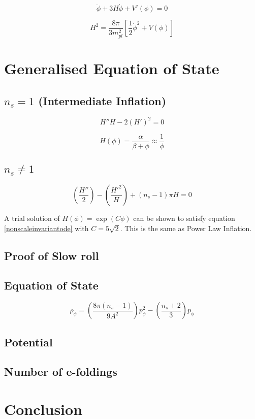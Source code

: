 \documentclass[12pt]{article} %
\begin{document}
\begin{equation}
\ddot{\phi} + 3H\dot{\phi}+V'(\phi)=0
\end{equation}

\begin{equation}
H^{2}=\frac{8\pi}{3 m_{pl}^{2}}[\frac{1}{2}\dot{\phi}^{2}+V(\phi)]
\end{equation}

\section{Generalised Equation of State}

\subsection{$n_{s}=1$ (Intermediate Inflation)}

\begin{equation}
H''H - 2(H')^{2}=0
\end{equation}

\begin{equation}
H(\phi) = \frac{\alpha}{\beta + \phi} \approx \frac{1}{\phi}
\end{equation}

\subsection{$n_{s} \neq 1$}

\begin{equation}\label{nonscaleinvariantode}
\left( \frac{H''}{2}\right) - \left( \frac{H'^{2}}{H}\right) + \left( n_{s} - 1\right)\pi H = 0
\end{equation}

A trial solution of $H(\phi) = \exp(C\phi)$ can be shown to satisfy equation \ref{nonscaleinvariantode} with $C=5\sqrt{2}$. This is the same as Power Law Inflation\cite{jerome}.

\subsection{Proof of Slow roll}

\subsection{Equation of State}

\begin{equation}
\rho_{\phi} = \left( \frac{8\pi \left(n_{s}-1\right)}{9 A^{2}}\right)p_{\phi}^{2} - \left(\frac{n_{s}+2}{3}\right)p_{\phi}
\end{equation}

\subsection{Potential}

\subsection{Number of e-foldings}

\section{Conclusion}

{}

\end{document}
